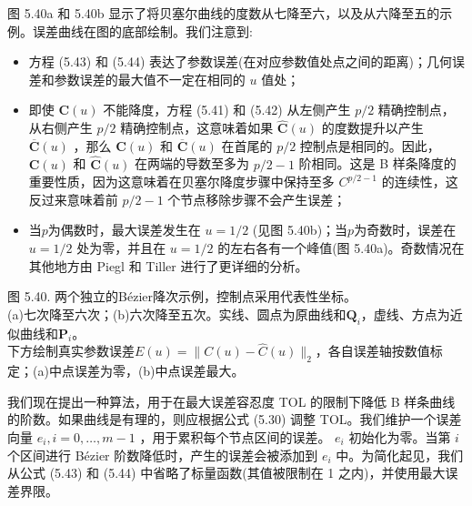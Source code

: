 \documentclass[../main.tex]{subfiles}
\begin{document}
图 5.40a 和 5.40b 显示了将贝塞尔曲线的度数从七降至六，以及从六降至五的示例。误差曲线在图的底部绘制。我们注意到:

\begin{itemize}
\item 方程 (5.43) 和 (5.44) 表达了参数误差(在对应参数值处点之间的距离)；几何误差和参数误差的最大值不一定在相同的 \(u\) 值处；
\end{itemize}

\begin{itemize}
\item 即使 \(\mathbf{C}\left( u\right)\) 不能降度，方程 (5.41) 和 (5.42) 从左侧产生 \(p/2\) 精确控制点，从右侧产生 \(p/2\) 精确控制点，这意味着如果 \(\widehat{\mathbf{C}}\left( u\right)\) 的度数提升以产生 \(\overline{\mathbf{C}}\left( u\right)\) ，那么 \(\mathbf{C}\left( u\right)\) 和 \(\overline{\mathbf{C}}\left( u\right)\) 在首尾的 \(p/2\) 控制点是相同的。因此， \(\mathbf{C}\left( u\right)\) 和 \(\widehat{\mathbf{C}}\left( u\right)\) 在两端的导数至多为 \(p/2 - 1\) 阶相同。这是 B 样条降度的重要性质，因为这意味着在贝塞尔降度步骤中保持至多 \({C}^{p/2 - 1}\) 的连续性，这反过来意味着前 \(p/2 - 1\) 个节点移除步骤不会产生误差；
\end{itemize}

\begin{itemize}
\item 当\(p\)为偶数时，最大误差发生在 \(u = 1/2\) (见图 5.40b)；当\(p\)为奇数时，误差在 \(u = 1/2\) 处为零，并且在 \(u = 1/2\) 的左右各有一个峰值(图 5.40a)。奇数情况在其他地方由 Piegl 和 Tiller \cite{Pieg95} 进行了更详细的分析。
\end{itemize}

\begin{center}
\begin{minipage}{30.5cm}
\vspace*{.6\baselineskip}
\centering
{}
\par\smallskip
图 5.40. 两个独立的Bézier降次示例，控制点采用代表性坐标。\\
(a)七次降至六次；(b)六次降至五次。实线、圆点为原曲线和$\mathbf Q_i$，虚线、方点为近似曲线和$\mathbf P_i$。\\
下方绘制真实参数误差$E(u)=\|C(u)-\widehat C(u)\|_2$，各自误差轴按数值标定；(a)中点误差为零，(b)中点误差最大。
\end{minipage}
\end{center}

我们现在提出一种算法，用于在最大误差容忍度 TOL 的限制下降低 B 样条曲线的阶数。如果曲线是有理的，则应根据公式 (5.30) 调整 TOL。我们维护一个误差向量 \({e}_{i},i = 0,\ldots ,m - 1\) ，用于累积每个节点区间的误差。 \({e}_{i}\) 初始化为零。当第 \(i\) 个区间进行 Bézier 阶数降低时，产生的误差会被添加到 \({e}_{i}\) 中。为简化起见，我们从公式 (5.43) 和 (5.44) 中省略了标量函数(其值被限制在 1 之内)，并使用最大误差界限。
\end{document}
